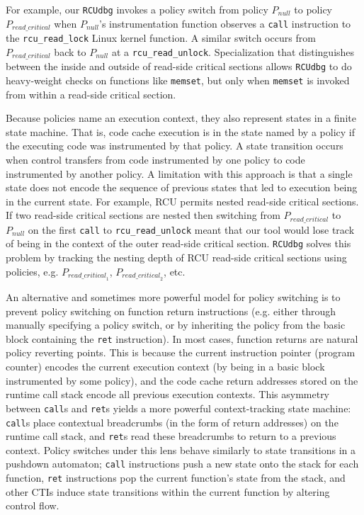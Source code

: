 \documentclass[preprint]{sigplanconf}
\begin{document}
For example, our \texttt{RCUdbg} invokes a policy switch from policy $P_{\mathit{null}}$ to policy $P_{\mathit{read\_critical}}$ when $P_{\mathit{null}}$'s instrumentation function observes a \texttt{call} instruction to the \texttt{rcu\_read\_lock} Linux kernel function. A similar switch occurs from $P_{\mathit{read\_critical}}$ back to $P_{\mathit{null}}$ at a \texttt{rcu\_read\_unlock}. Specialization that distinguishes between the inside and outside of read-side critical sections allows \texttt{RCUdbg} to do heavy-weight checks on functions like \texttt{memset}, but only when \texttt{memset} is invoked from within a read-side critical section.

Because policies name an execution context, they also represent states in a finite state machine. That is, code cache execution is in the state named by a policy if the  executing code was instrumented by that policy. A state transition occurs when control transfers from code instrumented by one policy to code instrumented by another policy. A limitation with this approach is that a single state does not encode the sequence of previous states that led to execution being in the current state. For example, RCU permits nested read-side critical sections. If two read-side critical sections are nested then switching from $P_{\mathit{read\_critical}}$ to $P_{\mathit{null}}$ on the first \texttt{call} to \texttt{rcu\_read\_unlock} meant that our tool would lose track of being in the context of the outer read-side critical section.  \texttt{RCUdbg} solves this problem by tracking the nesting depth of RCU read-side critical sections using policies, e.g. $P_{\mathit{read\_critical}_1}$, $P_{\mathit{read\_critical}_2}$, etc.

An alternative and sometimes more powerful model for policy switching is to prevent policy switching on function return instructions (e.g. either through manually specifying a policy switch, or by inheriting the policy from the basic block containing the \texttt{ret} instruction). In most cases, function returns are natural policy reverting points. This is because the current instruction pointer (program counter) encodes the current execution context (by being in a basic block instrumented by some policy), and the code cache return addresses stored on the runtime call stack encode all previous execution contexts. This asymmetry between \texttt{call}s and \texttt{ret}s yields a more powerful context-tracking state machine: \texttt{call}s place contextual breadcrumbs (in the form of return addresses) on the runtime call stack, and \texttt{ret}s read these breadcrumbs to return to a previous context. Policy switches under this lens behave similarly to state transitions in a pushdown automaton; \texttt{call} instructions push a new state onto the stack for each function, \texttt{ret} instructions pop the current function's state from the stack, and other CTIs induce state transitions within the current function by altering control flow.
\end{document}
